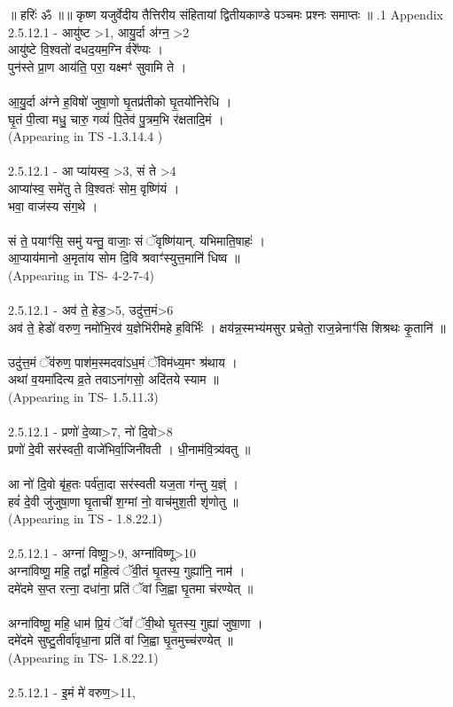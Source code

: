\documentclass[17pt]{extarticle}
\begin{document}
॥ हरिः॑ ॐ ॥॥ कृष्ण यजुर्वेदीय तैत्तिरीय संहितायां द्वितीयकाण्डे पञ्चमः प्रश्नः समाप्तः ॥ \newline
{}.1   Appendix\\2.5.12.1 - आयु॑ष्ट >1, आयु॒र्दा अ॑ग्न॒ >2\\आयु॑ष्टे वि॒श्वतो॑ दधद॒यम॒ग्नि र्वरे᳚ण्यः । \\पुन॑स्ते प्रा॒ण आय॑ति॒ परा॒ यक्ष्मꣳ॑ सुवामि ते । \\\\आ॒यु॒र्दा अ॑ग्ने ह॒विषो॑ जुषा॒णो घृ॒तप्र॑तीको घृ॒तयो॑निरेधि । \\घृ॒तं पी॒त्वा मधु॒ चारु॒ गव्यं॑ पि॒तेव॑ पु॒त्रम॒भि र॑क्षतादि॒मं । \\(Appearing in TS -1.3.14.4 )\\\\2.5.12.1 - आ प्या॑यस्व॒ >3, सं ते >4\\आप्या॑स्व॒ समे॑तु ते वि॒श्वतः॑ सोम॒ वृष्णि॑यं ।\\भवा॒ वाज॑स्य संग॒थे । \\\\सं ते॒ पयाꣳ॑सि॒ समु॑ यन्तु॒ वाजाः॒ सं ॅवृष्णि॑यान्. यभिमाति॒षाहः॑ ।\\आ॒प्याय॑मानो अ॒मृता॑य सोम दि॒वि श्रवाꣳ॑स्युत्त॒मानि॑ धिष्व ॥ \\(Appearing in TS- 4-2-7-4)\\\\2.5.12.1 - अव॑ ते॒ हेड॒>5, उदु॑त्त॒मं>6\\अव॑ ते॒ हेडो॑ वरुण॒ नमो॑भि॒रव॑ य॒ज्ञेभि॑रीमहे ह॒विर्भिः॑ । क्षय॑न्न॒स्मभ्य॑मसुर प्रचेतो॒ राज॒न्नेनाꣳ॑सि शिश्रथः कृ॒तानि॑ ॥ \\\\उदु॑त्त॒मं ॅव॑रुण॒ पाश॑म॒स्मदवा॑ऽध॒मं ॅविम॑ध्य॒मꣳ श्र॑थाय । \\अथा॑ व॒यमा॑दित्य व्र॒ते तवाऽना॑गसो॒ अदि॑तये स्याम ॥\\(Appearing in TS- 1.5.11.3)\\\\2.5.12.1 - प्रणो॑ दे॒व्या>7, नो॑ दि॒वो>8\\प्रणो॑ दे॒वी सर॑स्वती॒ वाजे॑भिर्वा॒जिनी॑वती । धी॒नाम॑वि॒त्र्य॑वतु ॥\\\\आ नो॑ दि॒वो बृ॑ह॒तः पर्व॑ता॒दा सर॑स्वती यज॒ता ग॑न्तु य॒ज्ञ्ं । \\हवं॑ दे॒वी जु॑जुषा॒णा घृ॒ताची॑ श॒ग्मां नो॒ वाच॑मुश॒ती शृ॑णोतु ॥\\(Appearing in TS - 1.8.22.1)\\\\2.5.12.1 - अग्ना॑ विष्णू॒>9, अग्ना॑विष्णू>10\\अग्ना॑विष्णू॒ महि॒ तद्वां᳚ महि॒त्वं ॅवी॒तं घृ॒तस्य॒ गुह्या॑नि॒ नाम॑ । \\दमे॑दमे स॒प्त रत्ना॒ दधा॑ना॒ प्रति॑ ॅवां जि॒ह्वा घृ॒तमा च॑रण्येत् ॥\\\\अग्ना॑विष्णू॒ महि॒ धाम॑ प्रि॒यं ॅवां᳚ ॅवी॒थो घृ॒तस्य॒ गुह्या॑ जुषा॒णा । \\दमे॑दमे सुष्टु॒तीर्वा॑वृधा॒ना प्रति॑ वां जि॒ह्वा घृ॒तमुच्च॑रण्येत् ॥\\(Appearing in TS- 1.8.22.1)\\\\2.5.12.1 - इ॒मं मे॑ वरुण॒>11, 
\end{document}
